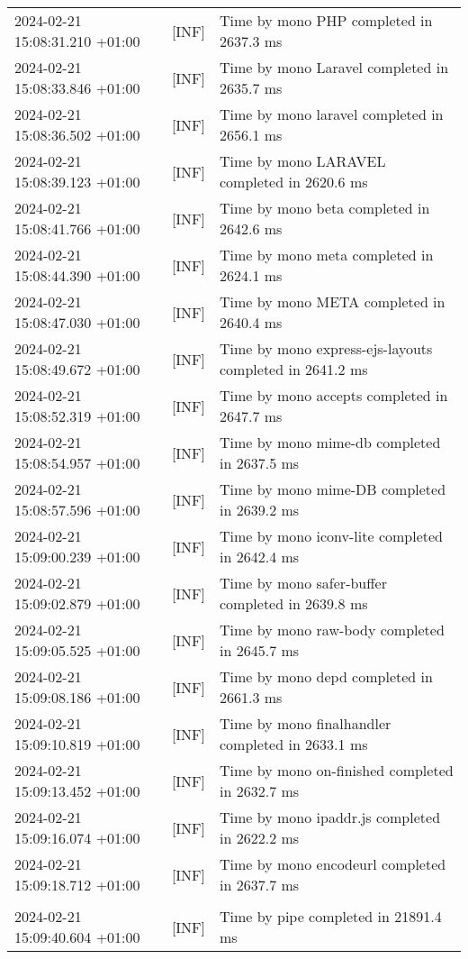{{\begin{tabularx}{\textwidth}{|l|l|X|}
                    2024-02-21 15:08:31.210 +01:00 & [INF] & Time by mono PHP completed in 2637.3 ms \\
                    2024-02-21 15:08:33.846 +01:00 & [INF] & Time by mono Laravel completed in 2635.7 ms \\
                    2024-02-21 15:08:36.502 +01:00 & [INF] & Time by mono laravel completed in 2656.1 ms \\
                    2024-02-21 15:08:39.123 +01:00 & [INF] & Time by mono LARAVEL completed in 2620.6 ms \\
                    2024-02-21 15:08:41.766 +01:00 & [INF] & Time by mono beta completed in 2642.6 ms \\
                    2024-02-21 15:08:44.390 +01:00 & [INF] & Time by mono meta completed in 2624.1 ms \\
                    2024-02-21 15:08:47.030 +01:00 & [INF] & Time by mono META completed in 2640.4 ms \\
                    2024-02-21 15:08:49.672 +01:00 & [INF] & Time by mono express-ejs-layouts completed in 2641.2 ms \\
                    2024-02-21 15:08:52.319 +01:00 & [INF] & Time by mono accepts completed in 2647.7 ms \\
                    2024-02-21 15:08:54.957 +01:00 & [INF] & Time by mono mime-db completed in 2637.5 ms \\
                    2024-02-21 15:08:57.596 +01:00 & [INF] & Time by mono mime-DB completed in 2639.2 ms \\
                    2024-02-21 15:09:00.239 +01:00 & [INF] & Time by mono iconv-lite completed in 2642.4 ms \\
                    2024-02-21 15:09:02.879 +01:00 & [INF] & Time by mono safer-buffer completed in 2639.8 ms \\
                    2024-02-21 15:09:05.525 +01:00 & [INF] & Time by mono raw-body completed in 2645.7 ms \\
                    2024-02-21 15:09:08.186 +01:00 & [INF] & Time by mono depd completed in 2661.3 ms \\
                    2024-02-21 15:09:10.819 +01:00 & [INF] & Time by mono finalhandler completed in 2633.1 ms \\
                    2024-02-21 15:09:13.452 +01:00 & [INF] & Time by mono on-finished completed in 2632.7 ms \\
                    2024-02-21 15:09:16.074 +01:00 & [INF] & Time by mono ipaddr.js completed in 2622.2 ms \\
                    2024-02-21 15:09:18.712 +01:00 & [INF] & Time by mono encodeurl completed in 2637.7 ms \\
                    & & \\
                    2024-02-21 15:09:40.604 +01:00 & [INF] & Time by pipe completed in 21891.4 ms \\
                    \hline
                \end{tabularx}
            }
        }

